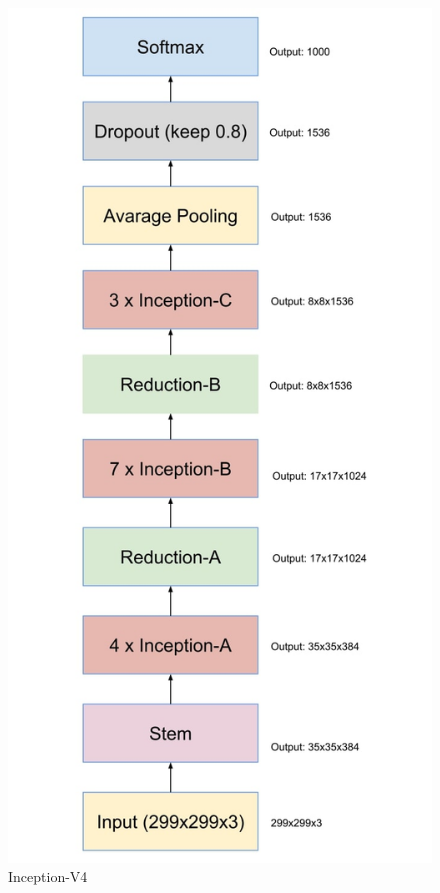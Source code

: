 \documentclass[titlepage]{report}
\begin{document}
\begin{figure}
\centering
\includegraphics[scale=0.3]{inception_v4}
\caption{Inception-V4}
\label{fig:inception_v4}
\end{figure}
\end{document}
